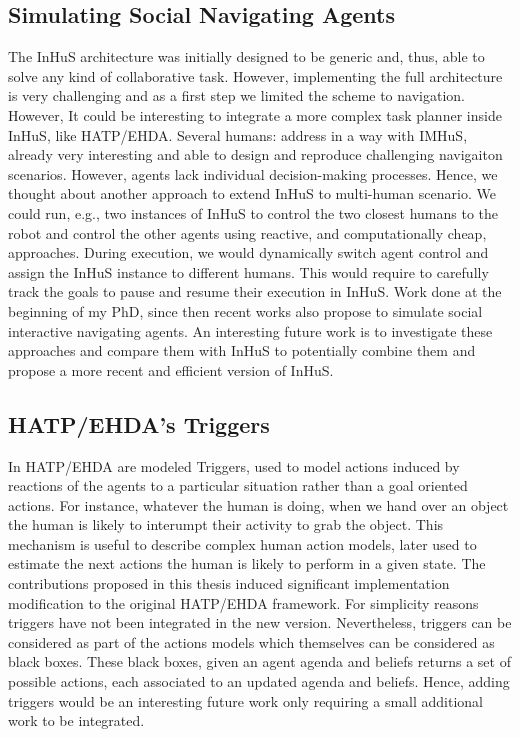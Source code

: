 \subsection*{Simulating Social Navigating Agents}

The InHuS architecture was initially designed to be generic and, thus, able to solve any kind of collaborative task. However, implementing the full architecture is very challenging and as a first step we limited the scheme to navigation. However, It could be interesting to integrate a more complex task planner inside InHuS, like HATP/EHDA.  
Several humans: address in a way with IMHuS, already very interesting and able to design and reproduce challenging navigaiton scenarios. However, agents lack individual decision-making processes. Hence, we thought about another approach to extend InHuS to multi-human scenario. We could run, e.g., two instances of InHuS to control the two closest humans to the robot and control the other agents using reactive, and computationally cheap, approaches. During execution, we would dynamically switch agent control and assign the InHuS instance to different humans. This would require to carefully track the goals to pause and resume their execution in InHuS. 
Work done at the beginning of my PhD, since then recent works also propose to simulate social interactive navigating agents. An interesting future work is to investigate these approaches and compare them with InHuS to potentially combine them and propose a more recent and efficient version of InHuS.   

\subsection*{HATP/EHDA's Triggers}

In HATP/EHDA are modeled Triggers, used to model actions induced by reactions of the agents to a particular situation rather than a goal oriented actions. For instance, whatever the human is doing, when we hand over an object the human is likely to interumpt their activity to grab the object. This mechanism is useful to describe complex human action models, later used to estimate the next actions the human is likely to perform in a given state. 
The contributions proposed in this thesis induced significant implementation modification to the original HATP/EHDA framework. For simplicity reasons triggers have not been integrated in the new version. Nevertheless, triggers can be considered as part of the actions models which themselves can be considered as black boxes. These black boxes, given an agent agenda and beliefs returns a set of possible actions, each associated to an updated agenda and beliefs. Hence, adding triggers would be an interesting future work only requiring a small additional work to be integrated.


